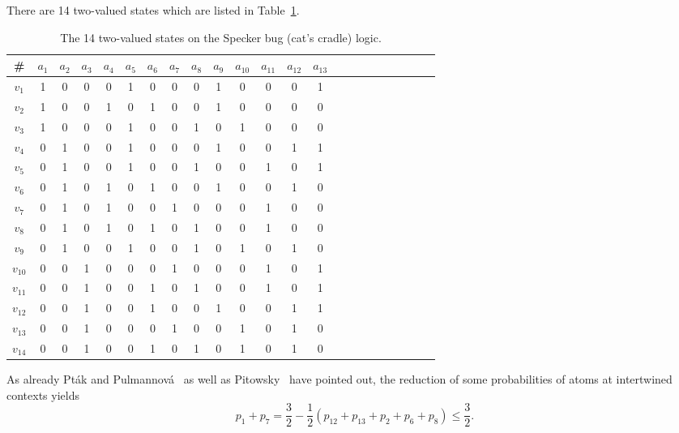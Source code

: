 \documentclass[%
  twocolumn,
 showpacs,
 showkeys,
 preprintnumbers,
 amsmath,amssymb,
 aps,
  pra,
  longbibliography,
 floatfix,
 ]{revtex4-1}
\begin{document}
There are 14 two-valued states which are listed in Table~\ref{2001-cesena-t2}.
 \begin{table}%
 \begin{center}
\caption{\label{2001-cesena-t2}  The 14 two-valued states on the Specker bug (cat's cradle) logic.}
 \begin{ruledtabular}
 \begin{tabular}{ccccccccccccccccccccccc}
\# &$a_1$&$a_2$&$a_3$&$a_4$&$a_5$&$a_6$&$a_7$&$a_8$&$a_9$&$a_{10}$&$a_{11}$&$a_{12}$&$a_{13}$\\
\hline
$v_1 $&1&0&0&0&1&0&0&0&1&0&0&0&1         \\
$v_2 $&1&0&0&1&0&1&0&0&1&0&0&0&0          \\
$v_3 $&1&0&0&0&1&0&0&1&0&1&0&0&0         \\
$v_4 $&0&1&0&0&1&0&0&0&1&0&0&1&1         \\
$v_5 $&0&1&0&0&1&0&0&1&0&0&1&0&1         \\
$v_6 $&0&1&0&1&0&1&0&0&1&0&0&1&0          \\
$v_7 $&0&1&0&1&0&0&1&0&0&0&1&0&0          \\
$v_8 $&0&1&0&1&0&1&0&1&0&0&1&0&0          \\
$v_9 $&0&1&0&0&1&0&0&1&0&1&0&1&0         \\
$v_{10}$&0&0&1&0&0&0&1&0&0&0&1&0&1         \\
$v_{11}$&0&0&1&0&0&1&0&1&0&0&1&0&1         \\
$v_{12}$&0&0&1&0&0&1&0&0&1&0&0&1&1         \\
$v_{13}$&0&0&1&0&0&0&1&0&0&1&0&1&0         \\
$v_{14}$&0&0&1&0&0&1&0&1&0&1&0&1&0         \\
 \end{tabular}
 \end{ruledtabular}
 \end{center}
 \end{table}

As already Pt{\'{a}}k and Pulmannov{\'{a}}~\cite[p.~39, Fig.~2.4.6]{pulmannova-91}
as well as
Pitowsky~\cite{Pitowsky2003395,pitowsky-06} have pointed out,
the reduction of some probabilities of atoms at intertwined contexts yields~\cite[p.~285, Eq.~(11.2)]{svozil-2016-s}
\begin{equation}
p_1+p_7=\frac{3}{2}- \frac{1}{2}\left(p_{12}+p_{13}+p_2+p_6+p_8\right)\le \frac{3}{2}
.
\label{2015-s-e2}
\end{equation}
\end{document}
